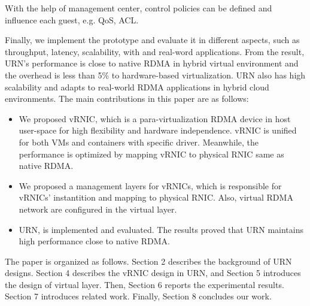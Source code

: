With the help of management center, control policies can be defined and influence each guest, e.g. QoS, ACL. 

Finally, we implement the prototype and evaluate it in different aspects, such as throughput, latency, scalability, with and real-word applications. From the result, URN's performance is close to native RDMA in hybrid virtual environment and the overhead is less than 5\% to hardware-based virtualization. URN also has high scalability and adapts to real-world RDMA applications in hybrid cloud environments. The main contributions in this paper are as follows:

\begin{itemize}
\item We proposed vRNIC, which is a para-virtualization RDMA device in host user-space for high flexibility and hardware independence. vRNIC is unified for both VMs and containers with specific driver. Meanwhile, the performance is optimized by mapping vRNIC to physical RNIC same as native RDMA.

\item We proposed a management layers for vRNICs, which is responsible for vRNICs' instantition and mapping to physical RNIC. Also, virtual RDMA network are configured in the virtual layer.

\item URN, is implemented and evaluated. The results proved that URN maintains high performance close to native RDMA.
\end{itemize}

The paper is organized as follows. Section 2 describes the background of URN designs. Section 4 describes the vRNIC design in URN, and Section 5 introduces the design of virtual layer. Then, Section 6 reports the experimental results. Section 7 introduces related work. Finally, Section 8 concludes our work.
